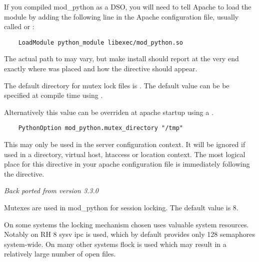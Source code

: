 \begin{description}

\item {} 

  If you compiled mod_python as a DSO, you will need to tell Apache to
  load the module by adding the following line in the Apache
  configuration file, usually called  or
  :

  \begin{verbatim}
    LoadModule python_module libexec/mod_python.so
  \end{verbatim}

  The actual path to  may vary, but make install
  should report at the very end exactly where 
  was placed and how the  directive should appear.

\item {} 

  The default directory for mutex lock files is . The
  default value can be be specified at compile time using
  .

  Alternatively this value can be overriden at apache startup using 
  a .

  \begin{verbatim}
    PythonOption mod_python.mutex_directory "/tmp"
  \end{verbatim}

  This may only be used in the server configuration context.
  It will be ignored if used in a directory, virtual host,
  htaccess or location context. The most logical place for this 
  directive in your apache configuration file is immediately
  following the  directive.

 \emph{Back ported from version 3.3.0}

\item {} 
  
  Mutexes are used in mod_python for session locking. The default
  value is 8.

  On some systems the locking mechanism chosen uses valuable
  system resources. Notably on RH 8 sysv ipc is used, which 
  by default provides only 128 semaphores system-wide.
  On many other systems flock is used which may result in a relatively
  large number of open files.


\end{description}
